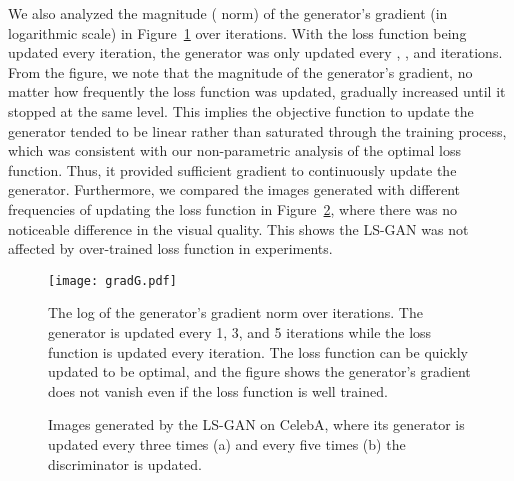 \documentclass[11pt,fullpage, letterpaper,twoside]{article}
\newcommand{\1}[1]{\mathds{1}_{\left[#1\right]}}
\begin{document}
We also analyzed the magnitude ( norm) of the generator's gradient (in logarithmic scale) in Figure~\ref{fig:gradG} over iterations. With the loss function being updated every iteration, the generator was only updated every , , and  iterations.
From the figure, we note that the magnitude of the generator's gradient, no matter how frequently the loss function was updated, gradually increased until it stopped at the same level. This implies the objective function to update the generator tended to be linear rather than saturated through the training process, which was consistent with our non-parametric analysis of the optimal loss function. Thus, it provided sufficient gradient to continuously update the generator. Furthermore, we compared the images generated with different frequencies of updating the loss function in Figure~\ref{fig:freq_gen}, where there was no noticeable difference in the visual quality.  This shows the LS-GAN was not affected by over-trained loss function in experiments.

\begin{figure}[t!]
    \centering
        \texttt{[image: gradG.pdf]}
        \caption{The log of the generator's gradient norm over iterations. The generator is updated every 1, 3, and 5 iterations while the loss function is updated every iteration.  The loss function can be quickly updated to be optimal, and the figure shows the generator's gradient does not vanish even if the loss function is well trained.}\label{fig:gradG}
\end{figure}

\begin{figure}[t]
\centering
{}
\caption{Images generated by the LS-GAN on CelebA, where its generator is updated every three times (a) and every five times (b) the discriminator is updated.}\label{fig:freq_gen}
\end{figure}
\end{document}
